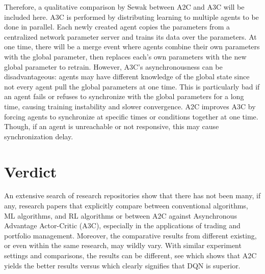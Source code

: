 Therefore, a qualitative comparison by Sewak \cite{LV52} between A2C and A3C will be included here. A3C is performed by distributing learning to multiple agents to be done in parallel. Each newly created agent copies the parameters from a centralized network parameter server and trains its data over the parameters. At one time, there will be a merge event where agents combine their own parameters with the global parameter, then replaces each's own parameters with the new global parameter to retrain. However, A3C's asynchronousness can be disadvantageous: agents may have different knowledge of the global state since not every agent pull the global parameters at one time. This is particularly bad if an agent fails or refuses to synchronize with the global parameters for a long time, causing training instability and slower convergence. A2C improves A3C by forcing agents to synchronize at specific times or conditions together at one time. Though, if an agent is unreachable or not responsive, this may cause synchronization delay.

\section{Verdict}
An extensive search of research repositories show that there has not been many, if any, research papers that explicitly compare between conventional algorithms, ML algorithms, and RL algorithms or between A2C against Asynchronous Advantage Actor-Critic (A3C), especially in the applications of trading and portfolio management. Moreover, the comparative results from different existing, or even within the same research, may wildly vary. With similar experiment settings and comparisons, the results can be different, see \cite{LV41} which shows that A2C yields the better results versus \cite{LV40} which clearly signifies that DQN is superior.

